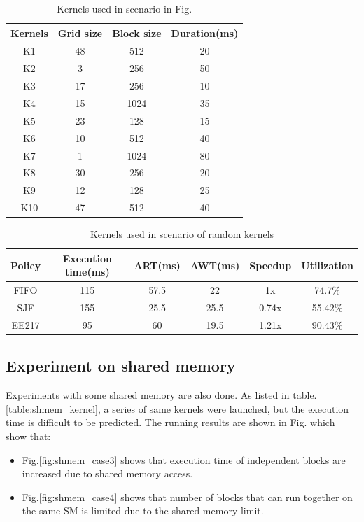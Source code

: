 \documentclass[conference]{IEEEtran}
\begin{document}
\begin{table}[h]
   \caption{Kernels used in scenario in Fig. } %
   \centering
   \begin{tabular}{|c|c|c|c|}
   \hline
   \bf Kernels & \bf Grid size & \bf Block size & \bf Duration(ms)\\
   \hline
   K1 & 48 & 512 & 20 \\
   K2 & 3 & 256 & 50\\ 
   K3 & 17 & 256 & 10 \\
   K4 & 15 & 1024 & 35 \\
   K5 & 23 & 128 & 15 \\ 
   K6 & 10 & 512 & 40 \\
   K7 & 1 & 1024 & 80 \\
   K8 & 30 & 256 & 20\\ 
   K9 & 12 & 128 & 25 \\
   K10 & 47 & 512 & 40 \\
   \hline
   \end{tabular}
   \label{table:scenario2_kernel}
\end{table}

\begin{table}[h]
   \caption{Kernels used in scenario of random kernels} %
   \centering
   \begin{tabular}{|c|c|c|c|c|c|}
   \hline
   \bf Policy & \bf Execution time(ms)& \bf ART(ms) & \bf AWT(ms) & \bf Speedup & \bf Utilization \\
   \hline
   FIFO & 115 & 57.5 & 22 & 1x & 74.7$\%$ \\
   SJF & 155 & 25.5 & 25.5 & 0.74x & 55.42$\%$ \\ 
   EE217 & 95 & 60 & 19.5 & 1.21x & 90.43$\%$ \\
   \hline
   \end{tabular}
   \label{table:scenario2_result}
\end{table}

\subsection{Experiment on shared memory}
Experiments with some shared memory are also done. As listed in table.\ref{table:shmem_kernel}, a series of same kernels were launched, but the execution time is difficult to be predicted. The running results are shown in Fig. which show that:
\begin{itemize}
   \item Fig.\ref{fig:shmem_case3} shows that execution time of independent blocks are increased due to shared memory access.
   \item Fig.\ref{fig:shmem_case4} shows that number of blocks that can run together on the same SM is limited due to the shared memory limit.
\end{itemize}
\end{document}
